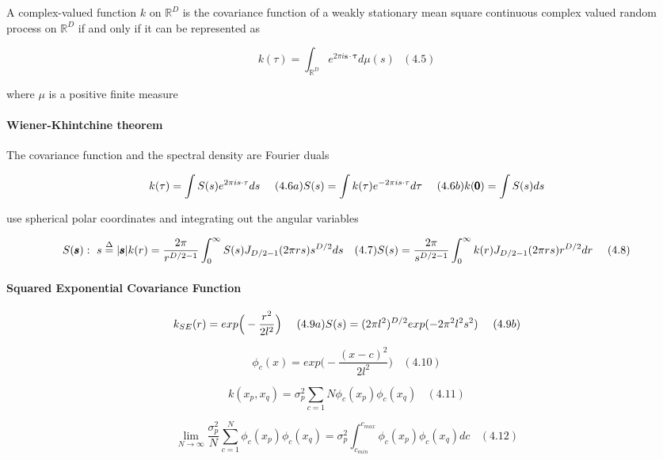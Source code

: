 \documentclass[
]{article}
\begin{document}
A complex-valued function \(k\) on \(\mathbb R^D\) is the covariance
function of a weakly stationary mean square continuous complex valued
random process on \(\mathbb R^D\) if and only if it can be represented
as

\[
k(\tau) = \int_{\mathbb{R}^D} e^{2\pi i \pmb{s} \cdot \pmb{\tau}} d\mu (s) \ \ \ (4.5)
\]

where \(\mu\) is a positive finite measure

\hypertarget{wiener-khintchine-theorem}{%
\paragraph{Wiener-Khintchine theorem}\label{wiener-khintchine-theorem}}

The covariance function and the spectral density are Fourier duals

\[
k(\tau) = \int S(s) e^{2\pi is \cdot \tau} ds
\ \ \ \ (4.6a)\\
S(s) = \int k(\tau) e^{-2\pi is\cdot \tau} d\tau
\ \ \ \ (4.6b)\\
k(\pmb 0) = \int S(s)ds
\]

use spherical polar coordinates and integrating out the angular
variables

\[
{S(\pmb s):\ s \stackrel {\Delta}{=} |\pmb s|}\\
k(r) = \frac {2\pi} {r^{D/2-1}} 
\int _0^{\infty} S(s)J_{D/2-1}
(2\pi rs)s^{D/2} ds \ \ \  (4.7)\\
S(s) = \frac {2\pi} {s^{D/2-1}} 
\int _0^{\infty} k(r)J_{D/2-1}
(2\pi rs) r^{D/2} dr\ \ \ \ (4.8)
\]

\hypertarget{squared-exponential-covariance-function}{%
\paragraph{Squared Exponential Covariance
Function}\label{squared-exponential-covariance-function}}

\[
k_{SE}(r) = exp \Big(- \frac {r^2} {2l^2} \Big) 
\ \ \ \ (4.9a)\\
S(s) = (2\pi l^2)^{D/2} exp(-2\pi^2l^2s^2)
\ \ \ \ (4.9b)
\]

\[
\phi_c(x) = exp \Big(- \frac {(x - c)^2} {2l^2}\Big)
\ \ \ \ (4.10)
\]

\[
k(x_p, x_q) = \sigma_p^2\sum_{c=1}{N}
\phi_c(x_p)\phi_c(x_q)
\ \ \ \ (4.11)
\]

\[
\lim_{N \rightarrow \infty}
\frac {\sigma^2_p} N \sum _{c=1}^N 
\phi_c(x_p)\phi_c(x_q) = \sigma_p^2 
\int ^{c_{max}}_{c_{min}} 
\phi_c(x_p)\phi_c(x_q)dc
\ \ \ \ (4.12)
\]
\end{document}
